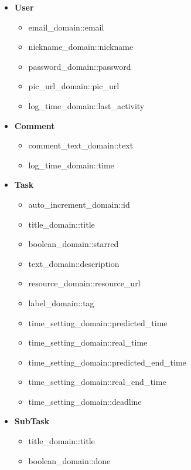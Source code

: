 \documentclass{article}
\begin{document}
\begin{itemize}
\item \textbf{User}

	\begin{itemize}
	
	\item email\_domain::email
	
	\item nickname\_domain::nickname
	
	\item password\_domain::password
	
	\item pic\_url\_domain::pic\_url
	
	\item log\_time\_domain::last\_activity
	\end{itemize}
	
\item \textbf{Comment}

	\begin{itemize}
	\item comment\_text\_domain::text
	\item log\_time\_domain::time
	\end{itemize}
	
\item \textbf{Task}

	\begin{itemize}
	\item auto\_increment\_domain::id
	\item title\_domain::title
	\item boolean\_domain::starred
	\item text\_domain::description
	\item resource\_domain::resource\_url
	\item label\_domain::tag
	\item time\_setting\_domain::predicted\_time
	\item time\_setting\_domain::real\_time
	\item time\_setting\_domain::predicted\_end\_time
	\item time\_setting\_domain::real\_end\_time
	\item time\_setting\_domain::deadline
	\end{itemize}
	
\item \textbf{SubTask}

	\begin{itemize}
	\item title\_domain::title
	\item boolean\_domain::done
	\end{itemize}
	

\end{itemize}
\end{document}
